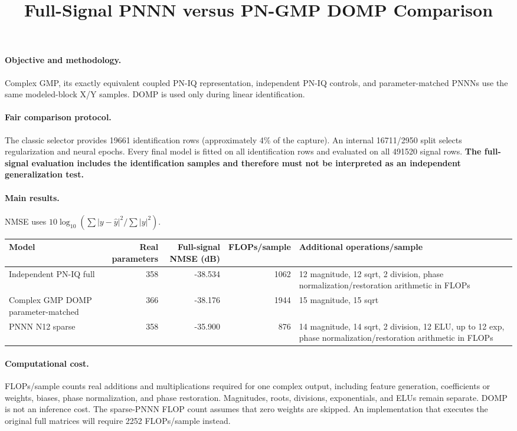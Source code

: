 \documentclass[9pt]{article}
\title{Full-Signal PNNN versus PN-GMP DOMP Comparison}
\date{}
\begin{document}
\maketitle
\paragraph{Objective and methodology.} Complex GMP, its exactly equivalent coupled PN-IQ representation, independent PN-IQ controls, and parameter-matched PNNNs use the same modeled-block X/Y samples. DOMP is used only during linear identification.
\paragraph{Fair comparison protocol.} The classic selector provides 19661 identification rows (approximately 4\% of the capture). An internal 16711/2950 split selects regularization and neural epochs. Every final model is fitted on all identification rows and evaluated on all 491520 signal rows. \textbf{The full-signal evaluation includes the identification samples and therefore must not be interpreted as an independent generalization test.}
\paragraph{Main results.} NMSE uses $10\log_{10}(\sum|y-\hat y|^2/\sum|y|^2)$.
\begin{center}\scriptsize\begin{tabularx}{\linewidth}{XrrrX}
\toprule
Model & Real parameters & Full-signal NMSE (dB) & FLOPs/sample & Additional operations/sample \\ \midrule
Independent PN-IQ full & 358 & -38.534 & 1062 & 12 magnitude, 12 sqrt, 2 division, phase normalization/restoration arithmetic in FLOPs \\ 
Complex GMP DOMP parameter-matched & 366 & -38.176 & 1944 & 15 magnitude, 15 sqrt \\ 
PNNN N12 sparse & 358 & -35.900 & 876 & 14 magnitude, 14 sqrt, 2 division, 12 ELU, up to 12 exp, phase normalization/restoration arithmetic in FLOPs \\ 
\bottomrule\end{tabularx}\end{center}
\paragraph{Computational cost.} FLOPs/sample counts real additions and multiplications required for one complex output, including feature generation, coefficients or weights, biases, phase normalization, and phase restoration. Magnitudes, roots, divisions, exponentials, and ELUs remain separate. DOMP is not an inference cost. The sparse-PNNN FLOP count assumes that zero weights are skipped. An implementation that executes the original full matrices will require 2252 FLOPs/sample instead.
\end{document}
